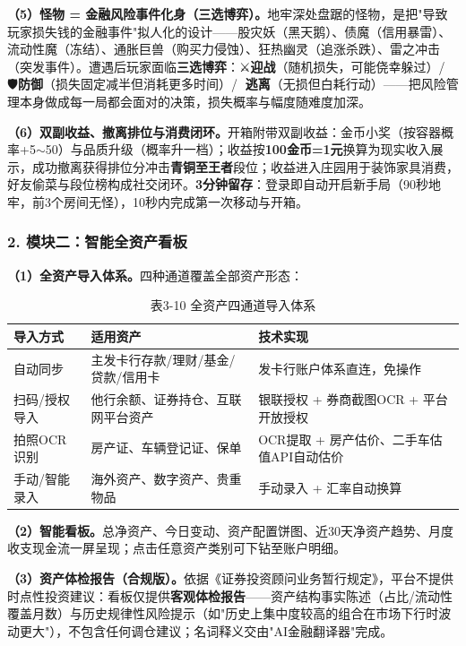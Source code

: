 \documentclass[12pt,a4paper]{ctexart}
\begin{document}
\textbf{（5）怪物 = 金融风险事件化身（三选博弈）。}地牢深处盘踞的怪物，是把"导致玩家损失钱的金融事件"拟人化的设计——股灾妖（黑天鹅）、债魔（信用暴雷）、流动性魔（冻结）、通胀巨兽（购买力侵蚀）、狂热幽灵（追涨杀跌）、雷之冲击（突发事件）。遭遇后玩家面临\textbf{三选博弈}：⚔️\textbf{迎战}（随机损失，可能侥幸躲过）/ 🛡️\textbf{防御}（损失固定减半但消耗更多时间）/ 🏃\textbf{逃离}（无损但白耗行动）——把风险管理本身做成每一局都会面对的决策，损失概率与幅度随难度加深。

\textbf{（6）双副收益、撤离排位与消费闭环。}开箱附带双副收益：金币小奖（按容器概率+5$\sim$50）与品质升级（概率升一档）；收益按\textbf{100金币=1元}换算为现实收入展示，成功撤离获得排位分冲击\textbf{青铜至王者}段位；收益进入庄园用于装饰家具消费，好友偷菜与段位榜构成社交闭环。\textbf{3分钟留存}：登录即自动开启新手局（90秒地牢，前3个房间无怪），10秒内完成第一次移动与开箱。

\subsubsection{2. 模块二：智能全资产看板}
\textbf{（1）全资产导入体系。}四种通道覆盖全部资产形态：

\begin{table}[htbp]
\centering
\begin{tabular}{p{2.8cm}p{3.4cm}p{6.4cm}}
\toprule
\textbf{导入方式} & \textbf{适用资产} & \textbf{技术实现} \\
\midrule
自动同步 & 主发卡行存款/理财/基金/贷款/信用卡 & 发卡行账户体系直连，免操作 \\
扫码/授权导入 & 他行余额、证券持仓、互联网平台资产 & 银联授权 + 券商截图OCR + 平台开放授权 \\
拍照OCR识别 & 房产证、车辆登记证、保单 & OCR提取 + 房产估价、二手车估值API自动估价 \\
手动/智能录入 & 海外资产、数字资产、贵重物品 & 手动录入 + 汇率自动换算 \\
\bottomrule
\end{tabular}
\caption*{表3-10 \quad 全资产四通道导入体系}
\end{table}

\textbf{（2）智能看板。}总净资产、今日变动、资产配置饼图、近30天净资产趋势、月度收支现金流一屏呈现；点击任意资产类别可下钻至账户明细。

\textbf{（3）资产体检报告（合规版）。}依据《证券投资顾问业务暂行规定》，平台不提供时点性投资建议：看板仅提供\textbf{客观体检报告}——资产结构事实陈述（占比/流动性覆盖月数）与历史规律性风险提示（如"历史上集中度较高的组合在市场下行时波动更大"），不包含任何调仓建议；名词释义交由"AI金融翻译器"完成。
\end{document}

